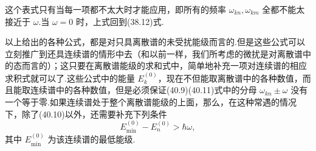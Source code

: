 这个表式只有当每一项都不太大时才能应用，即所有的频率 $\omega_{kn},\omega_{km}$ 全都不能太接近于 $\omega$.当 $\omega=0$ 时，上式回到(38.12)式.

以上给出的各种公式，都是对只具离散谱的未受扰能级而言的.但是这些公式可以立刻推广到还具连续谱的情形中去（和以前一样，我们所考虑的微扰是对离散谱中的态而言的）；这只要在离散谱能级的求和式中，简单地补充一项对连续谱的相应求积式就可以了.这些公式中的能量 $E_k^{(0)}$，现在不但能取离散谱中的各种数值，而且能取连续谱中的各种数值，但是必须保证(40.9)(40.11)式中的分母 $\omega_{kn}\pm\omega$ 没有一个等于零.如果连续谱处于整个离散谱能级的上面，那么，在这种常遇的情况下，除了(40.10)以外，还需要补充下列条件
\begin{equation}
  E_{\min}^{(0)}-E_n^{(0)}>\hbar\omega,
\end{equation}
其中 $E_{\min}^{(0)}$ 为该连续谱的最低能级.

